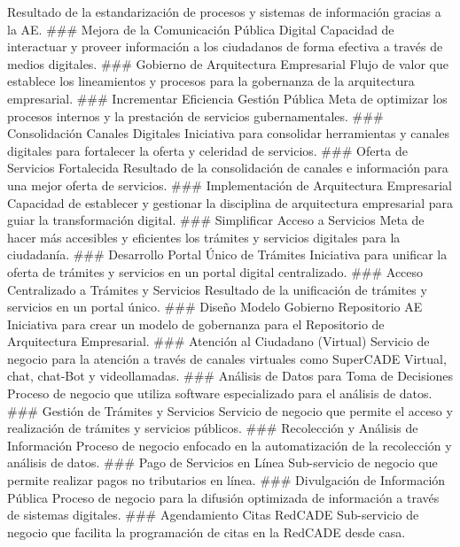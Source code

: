 \documentclass[
	a4paper, %
	12pt, %
]{include/CSSullivanBusinessReport}
\begin{document}
Resultado de la estandarización de procesos y sistemas de información
gracias a la AE. \#\#\# Mejora de la Comunicación Pública Digital
Capacidad de interactuar y proveer información a los ciudadanos de forma
efectiva a través de medios digitales. \#\#\# Gobierno de Arquitectura
Empresarial Flujo de valor que establece los lineamientos y procesos
para la gobernanza de la arquitectura empresarial. \#\#\# Incrementar
Eficiencia Gestión Pública Meta de optimizar los procesos internos y la
prestación de servicios gubernamentales. \#\#\# Consolidación Canales
Digitales Iniciativa para consolidar herramientas y canales digitales
para fortalecer la oferta y celeridad de servicios. \#\#\# Oferta de
Servicios Fortalecida Resultado de la consolidación de canales e
información para una mejor oferta de servicios. \#\#\# Implementación de
Arquitectura Empresarial Capacidad de establecer y gestionar la
disciplina de arquitectura empresarial para guiar la transformación
digital. \#\#\# Simplificar Acceso a Servicios Meta de hacer más
accesibles y eficientes los trámites y servicios digitales para la
ciudadanía. \#\#\# Desarrollo Portal Único de Trámites Iniciativa para
unificar la oferta de trámites y servicios en un portal digital
centralizado. \#\#\# Acceso Centralizado a Trámites y Servicios
Resultado de la unificación de trámites y servicios en un portal único.
\#\#\# Diseño Modelo Gobierno Repositorio AE Iniciativa para crear un
modelo de gobernanza para el Repositorio de Arquitectura Empresarial.
\#\#\# Atención al Ciudadano (Virtual) Servicio de negocio para la
atención a través de canales virtuales como SuperCADE Virtual, chat,
chat-Bot y videollamadas. \#\#\# Análisis de Datos para Toma de
Decisiones Proceso de negocio que utiliza software especializado para el
análisis de datos. \#\#\# Gestión de Trámites y Servicios Servicio de
negocio que permite el acceso y realización de trámites y servicios
públicos. \#\#\# Recolección y Análisis de Información Proceso de
negocio enfocado en la automatización de la recolección y análisis de
datos. \#\#\# Pago de Servicios en Línea Sub-servicio de negocio que
permite realizar pagos no tributarios en línea. \#\#\# Divulgación de
Información Pública Proceso de negocio para la difusión optimizada de
información a través de sistemas digitales. \#\#\# Agendamiento Citas
RedCADE Sub-servicio de negocio que facilita la programación de citas en
la RedCADE desde
casa.
\end{document}
